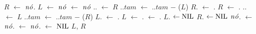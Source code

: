 \begin{algorithm}[H]
\caption{\treapSplitRight($\node$)}
\label{Algo:TREAPsplitRight}
\begin{algorithmic}[1]
\State $R$ $\gets $ $\node$.
\State $L$ $\gets $ $\node$ \label{Algo:TREAPsplitRight:linha:atribuicao}
\State {} $\gets$ $\node$
    \State {}.. $\gets$ $R$
    \State {}..$tam$ $\gets$ ..$tam$ $\mathit{-}$ \treapGetSize($L$)
    \State $R$. $\gets$ .
    \EndIf
    \State $R$ $\gets$ .
  \Else
    \State {}.. $\gets$ $L$ 
    \State {}..$tam$ $\gets$ ..$tam$ $\mathit{-}$ \treapGetSize($R$)
    \State $L$. $\gets$ .
    \EndIf
    \State $L$ $\gets$ .
  \EndIf
  \State {} $\gets$ .
\EndWhile
{} $L$. $\gets\text{NIL}$\EndIf
{} $R$. $\gets\text{NIL}$\EndIf
\State $\node$. $\gets $ $\node$. $\gets$ $\node$. $\gets$ $\text{NIL}$
\State\Return $L$, $R$
\end{algorithmic}
\end{algorithm}

